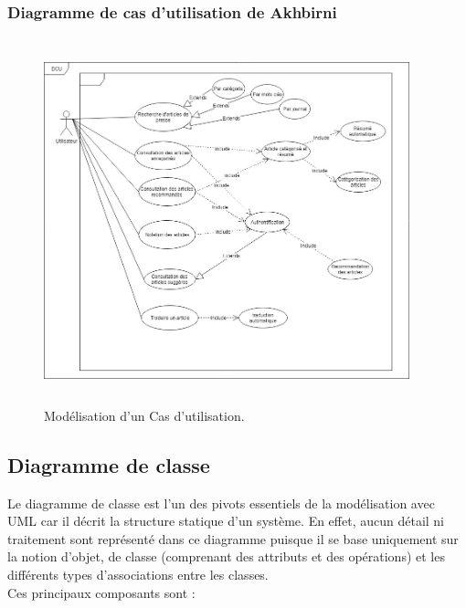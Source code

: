 \subsubsection{Diagramme de cas d'utilisation de Akhbirni}

    \begin{figure}[H]
    \centering
    \includegraphics[height=300pt,width=300pt]{img/chapter3/Cas_d'utilisation.jpg}
    \caption{Modélisation d'un Cas d'utilisation.}
    \end{figure}

\subsection{Diagramme de classe}
Le diagramme de classe est l'un des pivots essentiels de la modélisation avec UML car il décrit la structure statique d'un système. En effet, aucun détail ni traitement sont représenté dans ce diagramme puisque il 
se base uniquement sur la notion d'objet, de classe (comprenant des attributs et des opérations) et les différents types d'associations entre les classes.\\

Ces principaux composants sont :

